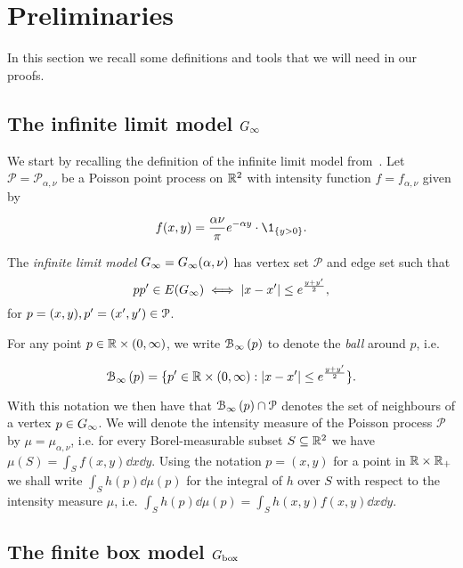 
\section{Preliminaries\label{sec:proof_outline}}

In this section we recall some definitions and tools that we will need in our proofs.

\subsection{The infinite limit model $G_{\infty}$\label{ssec:infinite_model}}

We start by recalling the definition of the infinite limit model from~\cite{fountoulakis2018law}.
Let $\mathcal{P}=\mathcal{P}_{\alpha,\nu}$ be a Poisson point process on ${\mathbb R}^2$ with intensity function $f=f_{\alpha,\nu}$ given by

\begin{equation}\label{eq:def_intensity_function_f}
	f(x,y) = \frac{\alpha \nu}{\pi} e^{-\alpha y} \cdot \1_{\{y>0\}}.
\end{equation} 

The \emph{infinite limit model} $G_{\infty} = G_{\infty}(\alpha,\nu)$ has vertex set $\mathcal{P}$ and edge set such that
\[
	pp' \in E(G_{\infty}) \iff |x - x'| \leq e^{\frac{y + y'}{2}},
\]
for $p=(x,y),p'=(x',y')\in{\mathcal P}$.

For any point $p \in {\ensuremath{\mathbb R}} \times (0,\infty)$, we write ${\mathcal B}_{\infty}\left(p\right)$ to denote the \emph{ball} around $p$, i.e.

\begin{equation}\label{eq:def_ball_P}
	{\mathcal B}_{\infty}\left(p\right) = \{p^\prime \in {\mathbb R}\times(0,\infty) : |x - x^\prime| \leq e^{\frac{y + y^\prime}{2}}\}.
\end{equation}

With this notation we then have that ${\mathcal B}_{\infty}\left(p\right) \cap {\mathcal P}$ denotes the set of neighbours of a vertex $p \in G_{\infty}$.
We will denote the intensity measure of the Poisson process $\mathcal{P}$ by $\mu = \mu_{\alpha, \nu}$, i.e. for every 
Borel-measurable subset $S \subseteq {\mathbb R}^2$ we have $\mu(S) = \int_S f(x,y) \dd x \dd y$. Using the notation $p = (x,y)$ for a point in ${\mathbb R} \times {\ensuremath{\mathbb R}}_+$ we shall write $\int_S h(p) \dd \mu(p)$ for the integral of $h$ over $S$ with respect to the intensity measure $\mu$, i.e. $\int_S h(p) \dd \mu(p) = \int_{S} h(x,y) f(x,y) \dd x \dd y$.


\subsection{The finite box model $G_{\mathrm{box}}$\label{ssec:finite_model}}


